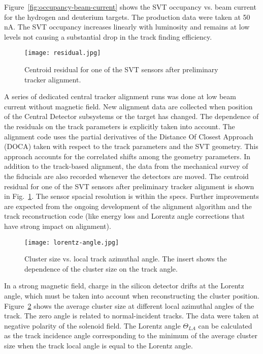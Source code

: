 Figure~\ref{fig:occupancy-beam-current} shows the SVT occupancy vs. beam current for the hydrogen and deuterium targets. The production data were taken at 50 nA. The SVT occupancy increases linearly with luminosity and remains at low levels not causing a substantial drop in the track finding efficiency.

\begin{figure}[hbt] 
\centering 
\texttt{[image: residual.jpg]}
\caption{Centroid residual for one of the SVT sensors after preliminary tracker alignment.}
\label{fig:residual}
\end{figure}

A series of dedicated central tracker alignment runs was done at low beam current without magnetic field. New alignment data are collected when position of the Central Detector subsystems or the target has changed. The dependence of the residuals on the track parameters is explicitly taken into account. The alignment code uses the partial derivatives of the Distance Of Closest Approach (DOCA) taken with respect to the track parameters and the SVT geometry. This approach accounts for the correlated shifts among the geometry parameters. In addition to the track-based alignment, the data from the mechanical survey of the fiducials are also recorded whenever the detectors are moved. The centroid residual for one of the SVT sensors after preliminary tracker alignment is shown in Fig.~\ref{fig:residual}. The sensor spacial resolution is within the specs. Further improvements are expected from the ongoing development of the alignment algorithm and the track reconstruction code (like energy loss and Lorentz angle corrections that have strong impact on alignment).

\begin{figure}[hbt] 
\centering 
\texttt{[image: lorentz-angle.jpg]}
\caption{Cluster size vs. local track azimuthal angle. The insert shows the dependence of the cluster size on the track angle.}
\label{fig:lorentz-angle}
\end{figure}

In a strong magnetic field, charge in the silicon detector drifts at the Lorentz angle, which must be taken into account when reconstructing the cluster position. Figure~\ref{fig:lorentz-angle} shows the average cluster size at different local azimuthal angles of the track. The zero angle is related to normal-incident tracks. The data were taken at negative polarity of the solenoid field. The Lorentz angle $\Theta_{LA}$ can be calculated as the track incidence angle corresponding to the minimum of the average cluster size when the track local angle is equal to the Lorentz angle.

